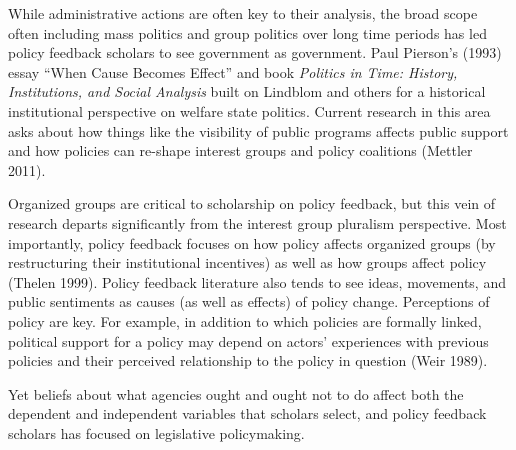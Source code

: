 
While administrative actions are often key to their analysis, the broad scope often including mass politics and group politics over long time periods has led policy feedback scholars to see government as government. Paul Pierson's (1993) essay ``When Cause Becomes Effect'' and book \textit{Politics in Time: History, Institutions, and Social Analysis} built on Lindblom and others for a historical institutional perspective on welfare state politics. Current research in this area asks about how things like the visibility of public programs affects public support and how policies can re-shape interest groups and policy coalitions (Mettler 2011). 

Organized groups are critical to scholarship on policy feedback, but this vein of research departs significantly from the interest group pluralism perspective. Most importantly, policy feedback focuses on how policy affects organized groups (by restructuring their institutional incentives) as well as how groups affect policy (Thelen 1999). Policy feedback literature also tends to see ideas, movements, and public sentiments as causes (as well as effects) of policy change. Perceptions of policy are key. For example, in addition to which policies are formally linked, political support for a policy may depend on actors' experiences with previous policies and their perceived relationship to the policy in question (Weir 1989). 



Yet beliefs about what agencies ought and ought not to do affect both the dependent and independent variables that scholars select, and policy feedback scholars has focused on legislative policymaking. %

